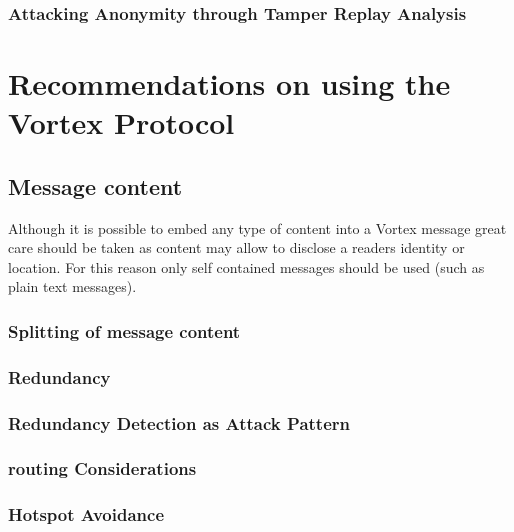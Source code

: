 \subsection{Attacking Anonymity through Tamper Replay Analysis}

\chapter{Recommendations on using the Vortex Protocol}

\section{Message content}
Although it is possible to embed any type of content into a Vortex message great care should be taken as content may allow to disclose a readers identity or location. For this reason only self contained messages should be used (such as plain text messages).

\subsection{Splitting of message content}


\subsection{Redundancy}


\subsection{Redundancy Detection as Attack Pattern}


\subsection{routing Considerations}


\subsection{Hotspot Avoidance}



